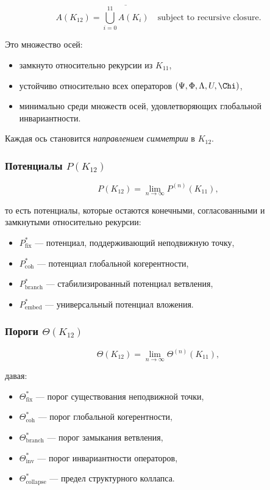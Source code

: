 \[
A(K_{12}) =
\overline{\bigcup_{i=0}^{11} A(K_i)}
\quad \text{subject to recursive closure}.
\]

Это множество осей:
\begin{itemize}
    \item замкнуто относительно рекурсии из $K_{11}$,
    \item устойчиво относительно всех операторов $(\Psi,\Phi,\Lambda,U,\Chi)$,
    \item минимально среди множеств осей, удовлетворяющих глобальной
          инвариантности.
\end{itemize}

Каждая ось становится \emph{направлением симметрии} в $K_{12}$.

\subsubsection{Потенциалы $P(K_{12})$}

\[
P(K_{12}) = \lim_{n\to\infty} P^{(n)}(K_{11}),
\]

то есть потенциалы, которые остаются конечными, согласованными и замкнутыми
относительно рекурсии:
\begin{itemize}
    \item $P_{\mathrm{fix}}^*$ — потенциал, поддерживающий неподвижную точку,
    \item $P_{\mathrm{coh}}^*$ — потенциал глобальной когерентности,
    \item $P_{\mathrm{branch}}^*$ — стабилизированный потенциал ветвления,
    \item $P_{\mathrm{embed}}^*$ — универсальный потенциал вложения.
\end{itemize}

\subsubsection{Пороги $\Theta(K_{12})$}

\[
\Theta(K_{12}) =
\lim_{n\to\infty} \Theta^{(n)}(K_{11}),
\]

давая:
\begin{itemize}
    \item $\Theta^*_{\mathrm{fix}}$ — порог существования неподвижной точки,
    \item $\Theta^*_{\mathrm{coh}}$ — порог глобальной когерентности,
    \item $\Theta^*_{\mathrm{branch}}$ — порог замыкания ветвления,
    \item $\Theta^*_{\mathrm{inv}}$ — порог инвариантности операторов,
    \item $\Theta^*_{\mathrm{collapse}}$ — предел структурного коллапса.
\end{itemize}

